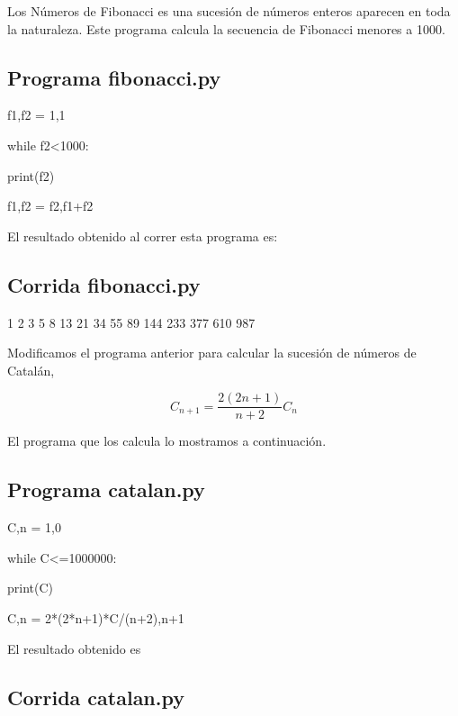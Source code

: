 \documentclass[12pt,spanish]{article}
\begin{document}
Los Números de Fibonacci  es una sucesión de números enteros aparecen en toda la naturaleza. Este programa calcula la secuencia de Fibonacci menores a 1000.

\subsection*{Programa fibonacci.py}

\begin{center}
 \begin{boxedverbatim}
  f1,f2 = 1,1

  while f2<1000:

      print(f2)

      f1,f2 = f2,f1+f2
 \end{boxedverbatim}
\end{center}

El resultado obtenido al correr esta programa es:

\subsection*{Corrida fibonacci.py}

\begin{center}
 \begin{boxedverbatim}
 1  2  3  5  8  13  21  34  55  89  144  233  377  610  987 
 \end{boxedverbatim}
\end{center}
Modificamos el programa anterior para calcular la sucesión de números de Catalán,

 \[C_{n+1}=\frac{2(2n+1)}{n+2}C_n \]

El programa que los calcula lo mostramos a continuación.

\subsection*{Programa catalan.py}

\begin{center}
 \begin{boxedverbatim}
  C,n = 1,0

  while C<=1000000:

      print(C)

      C,n = 2*(2*n+1)*C/(n+2),n+1
 \end{boxedverbatim}
\end{center}

El resultado obtenido es

\subsection*{Corrida catalan.py}
\end{document}
